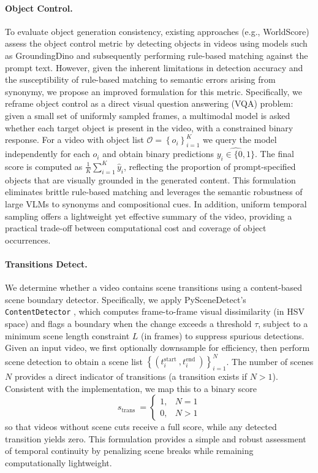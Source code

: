 \paragraph{Object Control.} To evaluate object generation consistency, existing approaches (e.g., WorldScore) assess the object control metric by detecting objects in videos using models such as GroundingDino and subsequently performing rule-based matching against the prompt text. However, given the inherent limitations in detection accuracy and the susceptibility of rule-based matching to semantic errors arising from synonymy, we propose an improved formulation for this metric. Specifically, we reframe object control as a direct visual question answering (VQA) problem: given a small set of uniformly sampled frames, a multimodal model is asked whether each target object is present in the video, with a constrained binary response. For a video with object list $\mathcal{O}=\left\{o_i\right\}_{i=1}^K$ we query the model independently for each $o_i$ and obtain binary predictions $\hat{y_{i} \in \{0,1\}}$. The final score is computed as $\frac{1}{K} \sum_{i=1}^K \hat{y}_i$, reflecting the proportion of prompt-specified objects that are visually grounded in the generated content. This formulation eliminates brittle rule-based matching and leverages the semantic robustness of large VLMs to synonyms and compositional cues. In addition, uniform temporal sampling offers a lightweight yet effective summary of the video, providing a practical trade-off between computational cost and coverage of object occurrences.

\paragraph{Transitions Detect.} We determine whether a video contains scene transitions using a content-based scene boundary detector. Specifically, we apply PySceneDetect’s \texttt{ContentDetector} \cite{scenedetect}, which computes frame-to-frame visual dissimilarity (in HSV space) and flags a boundary when the change exceeds a threshold $\tau$, subject to a minimum scene length constraint $L$ (in frames) to suppress spurious detections. Given an input video, we first optionally downsample for efficiency, then perform scene detection to obtain a scene list $\left\{\left(t_i^{\text {start }}, t_i^{\text {end }}\right)\right\}_{i=1}^N$. The number of scenes $N$ provides a direct indicator of transitions (a transition exists if $N > 1$). Consistent with the implementation, we map this to a binary score
\begin{equation}
s_{\text {trans }}= \begin{cases}1, & N=1 \\ 0, & N>1\end{cases}
\end{equation}
so that videos without scene cuts receive a full score, while any detected transition yields zero. This formulation provides a simple and robust assessment of temporal continuity by penalizing scene breaks while remaining computationally lightweight.




